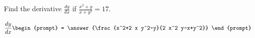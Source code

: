 \documentclass{ximera}
\author{Gregory Hartman \and Matthew Carr}
\begin{document}
\begin{exercise}




Find the derivative $\frac{dy}{dx}$ if $\frac{x^2+y}{x+y^2}=17$.

\[
\frac{dy}{dx}
\begin{prompt}
= \answer{\frac{x^2+2 x y^2-y}{2 x^2 y-x+y^2}}
\end{prompt}
\]


\end{exercise}
\end{document}
